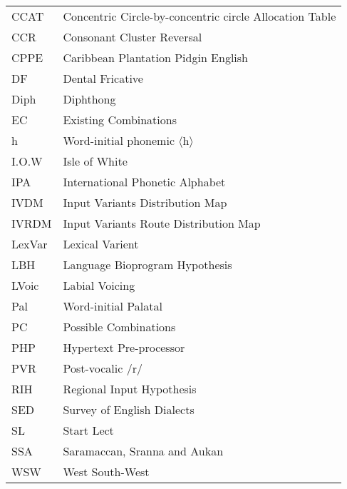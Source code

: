\noindent\begin{tabular}{@{}lp{9.5cm}@{}} 
CCAT        &    Concentric Circle-by-concentric circle Allocation Table \\
CCR        &    Consonant Cluster Reversal \\
CPPE       &    Caribbean Plantation Pidgin English \\
DF       &    Dental Fricative \\
Diph        &    Diphthong \\
EC        &    Existing Combinations \\
h       &    Word-initial phonemic $\langle$h$\rangle$ \\
I.O.W        &    Isle of White \\

IPA        &    International Phonetic Alphabet\\
IVDM        &    Input Variants Distribution Map \\
IVRDM       &    Input Variants Route Distribution Map \\
LexVar       &    Lexical Varient \\
LBH        &    Language Bioprogram Hypothesis \\
LVoic       &    Labial Voicing \\
Pal       &    Word-initial Palatal \\
PC        &    Possible Combinations \\        
PHP        &    Hypertext Pre-processor \\
PVR       &    Post-vocalic /r/\\
RIH       &    Regional Input Hypothesis \\
SED        &    Survey of English Dialects \\
SL        &    Start Lect \\
SSA       &    Saramaccan, Sranna and Aukan \\
WSW        &    West South-West
\end{tabular}
